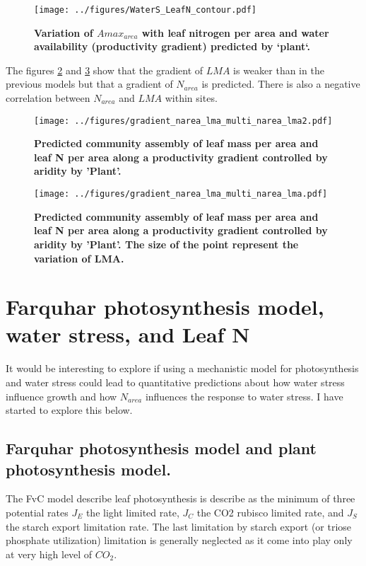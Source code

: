 \documentclass[a4paper,11pt]{article}
\begin{document}
\begin{figure}[ht]
\centering
\texttt{[image: ../figures/WaterS\_LeafN\_contour.pdf]}
\caption{\textbf{Variation of $A{max}_{area}$ with leaf nitrogen per area and water availability (productivity gradient) predicted by `plant`.}
\label{fig:leafN_water}}
\end{figure}

The figures \ref{fig:lma_narea1} and \ref{fig:lma_narea2} show that
the gradient of $LMA$ is weaker than in the previous models but that a gradient of $N_{area}$ is predicted. There is also a negative correlation between $N_{area}$ and $LMA$ within sites.

\begin{figure}[ht]
\centering
\texttt{[image: ../figures/gradient\_narea\_lma\_multi\_narea\_lma2.pdf]}
\caption{\textbf{Predicted community assembly of leaf mass per area and leaf N per area along a productivity gradient controlled by aridity by 'Plant'.}
\label{fig:lma_narea1}}
\end{figure}

\begin{figure}[ht]
\centering
\texttt{[image: ../figures/gradient\_narea\_lma\_multi\_narea\_lma.pdf]}
\caption{\textbf{Predicted community assembly of leaf mass per area and leaf N per area along a productivity gradient controlled by aridity by 'Plant'. The size of the point represent the variation of LMA.}
\label{fig:lma_narea2}}
\end{figure}

\clearpage

\section{Farquhar photosynthesis model, water stress, and Leaf N}


It would be interesting to explore if using a mechanistic model for
photosynthesis and water stress could lead to quantitative predictions
about how water stress influence growth and how $N_{area}$ influences the response to water stress. I have started to explore this below.


\subsection{Farquhar photosynthesis model and plant photosynthesis model.}

The FvC model describe leaf photosynthesis is describe as the minimum
of three potential rates $J_E$ the light limited rate, $J_C$ the CO2
rubisco limited rate, and $J_S$ the starch export limitation rate. The
last limitation by starch export (or triose phosphate utilization)
limitation is generally neglected as it come into play only at very
high level of $CO_2$.
\end{document}
